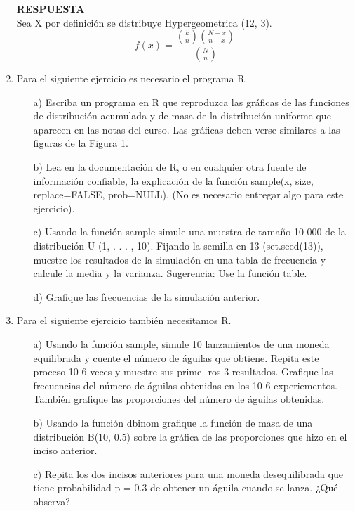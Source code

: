 \documentclass[11pt,letterpaper]{article}
\newcommand{\res}{\textbf{RESPUESTA}\\}
\begin{document}
\begin{enumerate}
\res 

Sea X por definición se distribuye Hypergeometrica (12, 3).
\begin{equation*}
f(x)= \frac{{k\choose n}{N-x\choose n-x}}{{N\choose n}}
\end{equation*}

\item Para el siguiente ejercicio es necesario el programa \textsc{R}.
\begin{itemize}
\item[a)] Escriba un programa en \textsc{R}  que reproduzca las gráficas de las funciones de distribución
acumulada y de masa de la distribución uniforme que aparecen en las notas del curso. Las gráficas deben verse similares a las figuras de la Figura 1.

\item[b)] Lea en la documentación de \textsc{R}, o en cualquier otra fuente de información confiable,
la explicación de la función sample(x, size, replace=FALSE, prob=NULL). (No es necesario entregar algo para este ejercicio).

\item[c)] Usando la función sample simule una muestra de tamaño 10 000 de la distribución
U (1, . . . , 10). Fijando la semilla en 13 (set.seed(13)), muestre los resultados de la
simulación en una tabla de frecuencia y calcule la media y la varianza. Sugerencia: Use la función table.
\item[d)] Grafique las frecuencias de la simulación anterior.
\end{itemize}


\item Para el siguiente ejercicio también necesitamos R.


\begin{itemize}
\item[a)] Usando la función sample, simule 10 lanzamientos de una moneda equilibrada y cuente
el número de águilas que obtiene. Repita este proceso 10 6 veces y muestre sus prime-
ros 3 resultados. Grafique las frecuencias del número de águilas obtenidas en los 10 6
experiementos. También grafique las proporciones del número de águilas obtenidas.
\item[b)] Usando la función dbinom grafique la función de masa de una distribución B(10, 0.5)
sobre la gráfica de las proporciones que hizo en el inciso anterior.
\item[c)] Repita los dos incisos anteriores para una moneda desequilibrada que tiene probabilidad
p = 0.3 de obtener un águila cuando se lanza. ¿Qué observa?
\end{itemize}


\end{enumerate}
\end{document}
